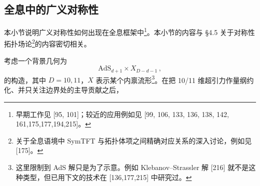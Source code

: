 
\subsection{全息中的广义对称性}
本小节说明广义对称性如何出现在全息框架中\footnote{早期工作见 [95, 101]；较近的应用例如见 [99, 106, 133, 136, 138, 142, 161,175,177,194,215]。}。本小节的内容与 §4.5 关于对称性拓扑场论\footnote{关于全息语境中 SymTFT 与拓扑体项之间精确对应关系的深入讨论，例如见 [175]。}的内容密切相关。

考虑一个背景几何为
\begin{equation}
  \mathrm{AdS}_{d+1} \times X_{D-d-1}\,, \tag{6.29}
\end{equation}
的构造，其中 $D = 10, 11$，$X$ 表示某个内禀流形\footnote{这里限制到 AdS 解只是为了示意。例如 Klebanov--Strassler 解 [216] 就不是这种类型，但已用下文的技术在 [136,177,215] 中研究过。}。在把 10/11 维超引力作量纲约化、并只关注边界处的主导贡献之后，
